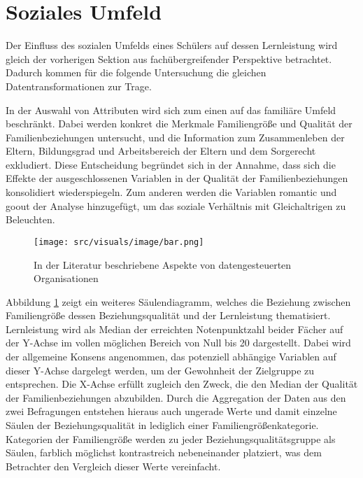 \section{Soziales Umfeld}

Der Einfluss des sozialen Umfelds eines Schülers auf dessen Lernleistung wird gleich der vorherigen Sektion aus fachübergreifender Perspektive betrachtet.
Dadurch kommen für die folgende Untersuchung die gleichen Datentransformationen zur Trage.

In der Auswahl von Attributen wird sich zum einen auf das familiäre Umfeld beschränkt. 
Dabei werden konkret die Merkmale Familiengröße und Qualität der Familienbeziehungen untersucht, und die Information zum Zusammenleben der Eltern, Bildungsgrad und Arbeitsbereich der Eltern und dem Sorgerecht exkludiert.
Diese Entscheidung begründet sich in der Annahme, dass sich die Effekte der ausgeschlossenen Variablen in der Qualität der Familienbeziehungen konsolidiert wiederspiegeln.
Zum anderen werden die Variablen romantic und goout der Analyse hinzugefügt, um das soziale Verhältnis mit Gleichaltrigen zu Beleuchten.

\begin{figure}[htb]
    \centering
    \texttt{[image: src/visuals/image/bar.png]}
    \caption{In der Literatur beschriebene Aspekte von datengesteuerten Organisationen}
    \label{fig:bar}
\end{figure}

Abbildung \ref{fig:bar} zeigt ein weiteres Säulendiagramm, welches die Beziehung zwischen Familiengröße dessen Beziehungsqualität und der Lernleistung thematisiert.
Lernleistung wird als Median der erreichten Notenpunktzahl beider Fächer auf der Y-Achse im vollen möglichen Bereich von Null bis 20 dargestellt.
Dabei wird der allgemeine Konsens angenommen, das potenziell abhängige Variablen auf dieser Y-Achse dargelegt werden, um der Gewohnheit der Zielgruppe zu entsprechen.
Die X-Achse erfüllt zugleich den Zweck, die den Median der Qualität der Familienbeziehungen abzubilden.
Durch die Aggregation der Daten aus den zwei Befragungen entstehen hieraus auch ungerade Werte und damit einzelne Säulen der Beziehungsqualität in lediglich einer Familiengrößenkategorie.
Kategorien der Familiengröße werden zu jeder Beziehungsqualitätsgruppe als Säulen, farblich möglichst kontrastreich nebeneinander platziert, was dem Betrachter den Vergleich dieser Werte vereinfacht. 

